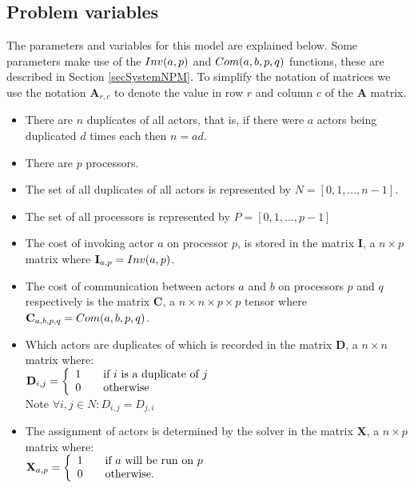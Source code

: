 \subsection{Problem variables}
\label{secModVars}


The parameters and variables for this model are explained below.
Some parameters make use of the $Inv(a, p)$ and $Com(a, b, p, q)$ functions, these are described in Section \ref{secSystemNPM}.
To simplify the notation of matrices we use the notation $\mathbf{A}_{r,c}$ to denote the value in row $r$ and column $c$ of the $\mathbf{A}$ matrix.

\begin{itemize}
	\item There are $n$ duplicates of all actors, that is, if there were $a$ actors being duplicated $d$ times each then $n = ad$.
	\item There are $p$ processors.
	\item The set of all duplicates of all actors is represented by $N = [0, 1, ..., n-1]$.
	\item The set of all processors is represented by $P = [0, 1, ..., p-1]$
	\item The cost of invoking actor $a$ on processor $p$, is stored in the matrix $\mathbf{I}$, a $n \times p$ matrix where $\mathbf{I}_{a,p} = Inv(a, p)$.
	\item The cost of communication between actors $a$ and $b$ on processors $p$ and $q$ respectively is the matrix $\mathbf{C}$, a $n \times n \times p \times p$ tensor where $\mathbf{C}_{a,b,p,q} = Com(a, b, p, q)$.
	\item Which actors are duplicates of which is recorded in the matrix $\mathbf{D}$, a $n \times n$ matrix where:\\
		$\mathbf{D}_{i,j} = \mbox{$\left\{ 
		\begin{array}{l l}
			1 \quad & \mbox{if $i$ is a duplicate of $j$}\\
			0 & \mbox{otherwise}\\ \end{array} \right.$}$ \\
		Note $\forall i, j \in N : D_{i,j} = D_{j,i}$ 
	\item The assignment of actors is determined by the solver in the matrix $\mathbf{X}$, a $n \times p$ matrix where:\\
	$\mathbf{X}_{a,p} = \mbox{$\left\{ 
		\begin{array}{l l}
			1 \quad & \mbox{if $a$ will be run on $p$}\\
			0 & \mbox{otherwise.}\\ \end{array} \right.$}$
\end{itemize}


